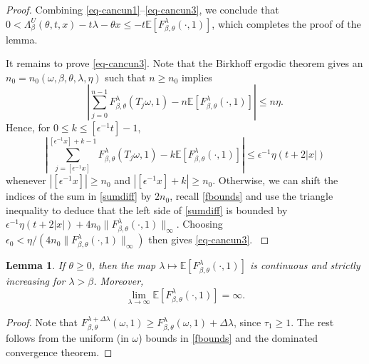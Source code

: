 \documentclass[a4paper]{amsart}
\numberwithin{equation}{section}
\theoremstyle{plain}
\newtheorem{lemma}[theorem]{\sc Lemma}
\theoremstyle{remark}
\begin{document}
\begin{proof}
      {}{Combining \eqref{eq-cancun1}--\eqref{eq-cancun3}, we conclude that
      $0 < \Lambda_\beta^U(\theta,t,x) - t\lambda - \theta x \le - t\mathbb{E}[F_{\beta,\theta}^\lambda(\cdot,1)]$, which completes the proof of the lemma.}

      {}{It remains to prove \eqref{eq-cancun3}.}
	 Note that
	 the Birkhoff ergodic theorem gives an 
	 $n_0 = n_0(\omega,\beta,\theta,\lambda,\eta)$ such that 
	 $n\ge n_0$ implies 
	 $$\left|\sum_{j=0}^{n-1}F_{\beta,\theta}^\lambda(T_j\omega,1) - 
	 n\mathbb{E}[F_{\beta,\theta}^\lambda(\cdot,1)]\right|\le n\eta.$$
	 Hence, for $0\le k\le [{\epsilon^{-1}} t]-1$,
\begin{equation}\label{sumdiff}
\left|\sum_{j=[{\epsilon^{-1}} x]}^{[{\epsilon^{-1}} x]+k-1}F_{\beta,\theta}^\lambda(T_j\omega,1) - k\mathbb{E}[F_{\beta,\theta}^\lambda(\cdot,1)]\right|\le {\epsilon^{-1}}\eta (t + 2|x|)
\end{equation}
whenever $|[{\epsilon^{-1}} x]| \ge n_0$ and $|[{\epsilon^{-1}} x]+k| \ge n_0$. 
Otherwise, we can shift the indices of the sum in 
\eqref{sumdiff} by $2n_0$, recall 
\eqref{fbounds} and use the triangle inequality to deduce that
{}{the left side of \eqref{sumdiff} is bounded by 
${\epsilon^{-1}}\eta (t + 2|x|)+4n_0\|F^\lambda_{\beta,\theta}(\cdot,1)\|_\infty$.
Choosing $\epsilon_0<\eta/(4 n_0\|F^\lambda_{\beta,\theta}(\cdot,1)\|_\infty)$
then gives \eqref{eq-cancun3}. }
	  
	
\end{proof}

\begin{lemma}\label{lemincrease}
If $\theta\ge0$, then the map $\lambda\mapsto \mathbb{E}[F_{\beta,\theta}^\lambda(\cdot,1)]$ is continuous and strictly increasing for $\lambda > \beta$. Moreover,
$$\lim_{\lambda\to\infty}\mathbb{E}[F_{\beta,\theta}^\lambda(\cdot,1)] = \infty.$$
\end{lemma}

\begin{proof}
Note that $F_{\beta,\theta}^{\lambda + \Delta\lambda}(\omega,1) \ge F_{\beta,\theta}^\lambda(\omega,1) + \Delta\lambda$, since $\tau_1\ge1$. The rest follows from the uniform (in $\omega$) bounds in \eqref{fbounds} and the dominated convergence theorem.
\end{proof}
\end{document}
